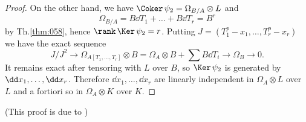 \documentclass[../main]{subfiles}
\begin{document}
\begin{proof}
On the other hand, we have $\Coker \, \psi_2 = \Omega_{B/A} \otimes L$ and \[\Omega_{B/A} = B \dd T_1 + \ldots + B \dd T_r = B^r\] by Th.\ref{thm:058}, hence $\rank \, \Ker \, \psi_2 = r$. Putting $J = (T_1^p - x_1, \ldots, T_r^p - x_r)$ we have the exact sequence \[J/J^2 \longrightarrow \Omega_{A[T_1, \ldots, T_r]} \otimes B = \Omega_A \otimes B + \sum B \dd T_i \longrightarrow \Omega_B \longrightarrow 0.\] It remains exact after tensoring with $L$ over $B$, so $\Ker \, \psi_2$ is generated by $\dd x_1, \ldots,\linebreak\dd x_r$. Therefore $\dd x_1, \ldots, \dd x_r$ are linearly independent in $\Omega_A \otimes L$ over $L$ and a fortiori so in $\Omega_A \otimes K$ over $K$. 
\end{proof}

(This proof is due to \cite{faltings1978Ein})
\end{document}
